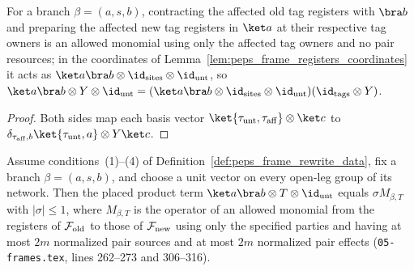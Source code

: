 \begin{lemma}
    \label{lem:peps_frame_tag_change}
    \leanok
    For a branch $\beta=(a,s,b)$, contracting the affected old tag registers with $\bra b$ and preparing the affected new tag registers in
    $\ket a$ at their respective tag owners is an allowed monomial using only the
    affected tag owners and no pair resources; in the coordinates of Lemma~\ref{lem:peps_frame_registers_coordinates} it acts
    as $\ket a\bra b\otimes\id_{\rm sites}\otimes\id_{\rm unt}$, so $\ket a\bra b\otimes Y\otimes\id_{\rm unt}=(\ket a\bra b\otimes\id_{\rm sites}\otimes\id_{\rm unt})(\id_{\rm tags}\otimes Y)$.
\end{lemma}

\begin{proof}\leanok
    Both sides map each basis vector $\ket{\tau_{\rm unt},\tau_{\rm aff}}\otimes\ket c$ to
    $\delta_{\tau_{\rm aff},b}\ket{\tau_{\rm unt},a}\otimes Y\ket c$.
\end{proof}

\begin{lemma}
    \label{thm:peps_frame_small_rewrite_term_monomial}
    \leanok
    Assume conditions~(1)--(4) of Definition~\ref{def:peps_frame_rewrite_data}, fix a branch $\beta=(a,s,b)$, and
    choose a unit vector on every open-leg group of its network. Then the
    placed product term $\ket a\bra b\otimes T\otimes\id_{\rm unt}$
    equals $\sigma M_{\beta,T}$ with $\lvert\sigma\rvert\le1$, where $M_{\beta,T}$ is the operator of an allowed monomial from the registers
    of $\mathcal F_{\rm old}$ to those of $\mathcal F_{\rm new}$ using only the specified parties and
    having at most $2m$ normalized pair sources and at most $2m$ normalized pair
    effects (\texttt{05-frames.tex}, lines 262--273 and 306--316).
\end{lemma}

